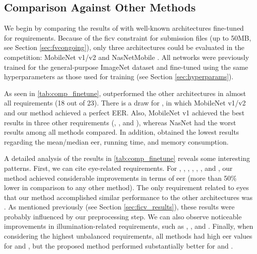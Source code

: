 \subsection{Comparison Against Other Methods}
 
We begin by comparing the results of \methodname with well-known architectures fine-tuned for \icao requirements. Because of the \acs{ficv} constraint for submission files (up to 50MB, see Section \ref{sec:fvcongoing}), only three architectures could be evaluated in the competition: MobileNet v1/v2 \citep{howard2017mobilenets, sandler2018mobilenetv2} and NasNetMobile \citep{zoph2018learning}. All networks were previously trained for the general-purpose ImageNet dataset \citep{imagenetdataset} and fine-tuned using the same hyperparameters as those used for \methodname training (see Section \ref{sec:hyperparams}).
 
As seen in \autoref{tab:comp_finetune}, \methodname outperformed the other architectures in almost all requirements (18 out of 23). There is a draw for \veiloverface, in which MobileNet v1/v2 and our method achieved a perfect EER. Also, MobileNet v1 achieved the best results in three other requirements (\pixelation, \hatcap, and \otherfacesortoys), whereas NasNet had the worst results among all methods compared. In addition, \methodname obtained the lowest results regarding the mean/median \acs{eer}, running time, and memory consumption.
 
A detailed analysis of the results in \autoref{tab:comp_finetune} reveals some interesting patterns. First, we can cite eye-related requirements. For \lookingaway, \eyesclosed, \redeyes, \darktintedlenses, \flashlenses, \framestooheavy, and \framecoveringeyes, our method achieved considerable improvements in terms of \acs{eer} (more than 50\% lower
in comparison to any other method). The only requirement related to eyes that our method accomplished similar performance to the other architectures was \hairacrosseyes. As mentioned previously (see Section \ref{sec:ficv_results}), these results were probably influenced by our preprocessing step. We can also observe noticeable improvements in illumination-related requirements, such as \toodarklight, \shadowsbehindhead, and \shadowsacrossface. Finally, when considering the highest unbalanced requirements, all methods had high \acs{eer} values for \inkmarked and \otherfacesortoys, but the proposed method performed substantially better for \washedout and \framestooheavy.
 

 
